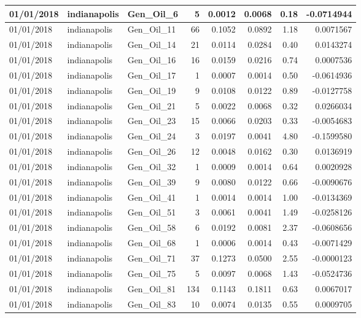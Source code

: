 \documentclass[
  letterpaper,
  DIV=11,
  numbers=noendperiod]{scrartcl}
\begin{document}
\begin{tabular}{l|l|l|r|r|r|r|r}
\hline
01/01/2018 & indianapolis & Gen\_Oil\_6 & 5 & 0.0012 & 0.0068 & 0.18 & -0.0714944\\
\hline
01/01/2018 & indianapolis & Gen\_Oil\_11 & 66 & 0.1052 & 0.0892 & 1.18 & 0.0071567\\
\hline
01/01/2018 & indianapolis & Gen\_Oil\_14 & 21 & 0.0114 & 0.0284 & 0.40 & 0.0143274\\
\hline
01/01/2018 & indianapolis & Gen\_Oil\_16 & 16 & 0.0159 & 0.0216 & 0.74 & 0.0007536\\
\hline
01/01/2018 & indianapolis & Gen\_Oil\_17 & 1 & 0.0007 & 0.0014 & 0.50 & -0.0614936\\
\hline
01/01/2018 & indianapolis & Gen\_Oil\_19 & 9 & 0.0108 & 0.0122 & 0.89 & -0.0127758\\
\hline
01/01/2018 & indianapolis & Gen\_Oil\_21 & 5 & 0.0022 & 0.0068 & 0.32 & 0.0266034\\
\hline
01/01/2018 & indianapolis & Gen\_Oil\_23 & 15 & 0.0066 & 0.0203 & 0.33 & -0.0054683\\
\hline
01/01/2018 & indianapolis & Gen\_Oil\_24 & 3 & 0.0197 & 0.0041 & 4.80 & -0.1599580\\
\hline
01/01/2018 & indianapolis & Gen\_Oil\_26 & 12 & 0.0048 & 0.0162 & 0.30 & 0.0136919\\
\hline
01/01/2018 & indianapolis & Gen\_Oil\_32 & 1 & 0.0009 & 0.0014 & 0.64 & 0.0020928\\
\hline
01/01/2018 & indianapolis & Gen\_Oil\_39 & 9 & 0.0080 & 0.0122 & 0.66 & -0.0090676\\
\hline
01/01/2018 & indianapolis & Gen\_Oil\_41 & 1 & 0.0014 & 0.0014 & 1.00 & -0.0134369\\
\hline
01/01/2018 & indianapolis & Gen\_Oil\_51 & 3 & 0.0061 & 0.0041 & 1.49 & -0.0258126\\
\hline
01/01/2018 & indianapolis & Gen\_Oil\_58 & 6 & 0.0192 & 0.0081 & 2.37 & -0.0608656\\
\hline
01/01/2018 & indianapolis & Gen\_Oil\_68 & 1 & 0.0006 & 0.0014 & 0.43 & -0.0071429\\
\hline
01/01/2018 & indianapolis & Gen\_Oil\_71 & 37 & 0.1273 & 0.0500 & 2.55 & -0.0000123\\
\hline
01/01/2018 & indianapolis & Gen\_Oil\_75 & 5 & 0.0097 & 0.0068 & 1.43 & -0.0524736\\
\hline
01/01/2018 & indianapolis & Gen\_Oil\_81 & 134 & 0.1143 & 0.1811 & 0.63 & 0.0067017\\
\hline
01/01/2018 & indianapolis & Gen\_Oil\_83 & 10 & 0.0074 & 0.0135 & 0.55 & 0.0009705\\

\end{tabular}
\end{document}
